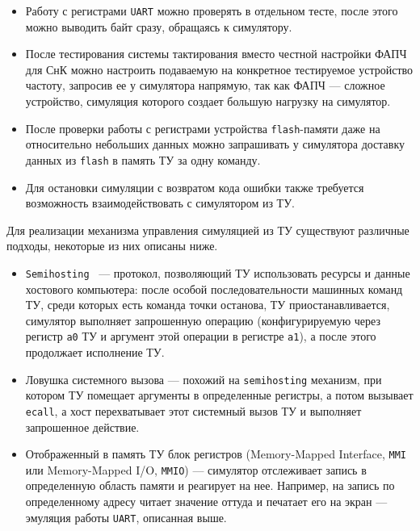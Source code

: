 \begin{itemize}
    \item Работу с регистрами \texttt{UART} можно проверять в отдельном тесте, после этого можно выводить байт сразу, обращаясь к симулятору.
    \item После тестирования системы тактирования вместо честной настройки ФАПЧ для СнК можно настроить подаваемую на конкретное тестируемое устройство частоту, запросив ее у симулятора напрямую, так как ФАПЧ --- сложное устройство, симуляция которого создает большую нагрузку на симулятор.
    \item После проверки работы с регистрами устройства \texttt{flash}-памяти даже на относительно небольших данных можно запрашивать у симулятора доставку данных из \texttt{flash} в память ТУ за одну команду.
    \item Для остановки симуляции с возвратом кода ошибки также требуется возможность взаимодействовать с симулятором из ТУ.
\end{itemize}

Для реализации механизма управления симуляцией из ТУ существуют различные подходы, некоторые из них описаны ниже.

\begin{itemize}
    \item \texttt{Semihosting}~\cite{RiscvSemihosting, ArmSemihosting} --- протокол, позволяющий ТУ использовать ресурсы и данные хостового компьютера: после особой последовательности машинных команд ТУ, среди которых есть команда точки останова, ТУ приостанавливается, симулятор выполняет запрошенную операцию (конфигурируемую через регистр \texttt{a0} ТУ и аргумент этой операции в регистре \texttt{a1}), а после этого продолжает исполнение ТУ.
    \item Ловушка системного вызова --- похожий на \texttt{semihosting} механизм, при котором ТУ помещает аргументы в определенные регистры, а потом вызывает \texttt{ecall}, а хост перехватывает этот системный вызов ТУ и выполняет запрошенное действие.
    \item Отображенный в память ТУ блок регистров (Memory-Mapped Interface, \texttt{MMI} или Memory-Mapped I/O, \texttt{MMIO}) --- симулятор отслеживает запись в определенную область памяти и реагирует на нее. Например, на запись по определенному адресу читает значение оттуда и печатает его на экран --- эмуляция работы \texttt{UART}, описанная выше.
\end{itemize}


